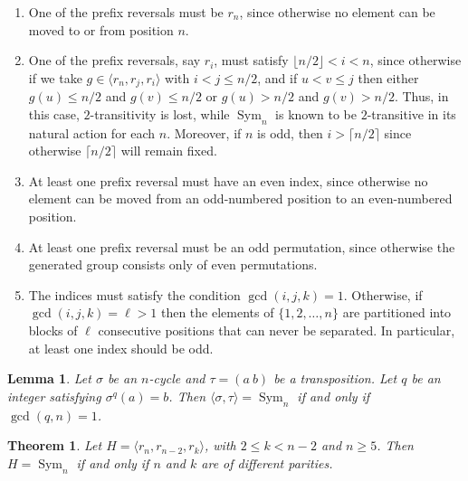 \documentclass[10pt,a4paper]{amsart}
\theoremstyle{plain}
\newtheorem{theorem}{Theorem}
\newtheorem{lemma}{Lemma}
\theoremstyle{definition}
\DeclareMathOperator{\Sym}{\mathrm{Sym}}
\begin{document}
\begin{enumerate}
    \item[$(1)$] One of the prefix reversals must be $r_n$, since otherwise no element can be moved to or from position $n$. 
    \item[$(2)$] One of the prefix reversals, say $r_i$, must satisfy $\lfloor n/2 \rfloor < i < n$, since otherwise if we take $g\in \langle r_n, r_j, r_i\rangle$ with $i<j \leqslant n/2$, and if $u <v \leqslant j$ then either $g(u) \leqslant n/2$ and $g(v) \leqslant n/2$ or $g(u) > n/2$ and $g(v)> n/2$. Thus, in this case, $2$-transitivity is lost, while $\Sym_n$ is known to be $2$-transitive in its natural action for each $n$. Moreover, if $n$ is odd, then $i>\lceil n/2\rceil$ since otherwise $\lceil n/2\rceil$ will remain fixed. 
    \item[$(3)$] At least one prefix reversal must have an even index, since otherwise no element can be moved from an odd-numbered position to an even-numbered position. 
    \item[$(4)$] At least one prefix reversal must be an odd permutation, since otherwise the generated group consists only of even permutations. 
    \item[$(5)$] The indices must satisfy the condition $\gcd(i,j,k)=1$. Otherwise, if $\gcd(i,j,k)=\ell>1$ then the elements of $\{1,2,\ldots,n\}$ are partitioned into blocks of $\ell$ consecutive positions that can never be separated. In particular, at least one index should be odd.
\end{enumerate}

\begin{lemma}\label{lem:janusz} Let $\sigma$ be an $n$-cycle and $\tau=(a \ b)$ be a transposition. Let $q$ be an integer satisfying $\sigma^q(a)=b$. Then $\langle \sigma,\tau\rangle=\Sym_n$ if and only if $\gcd(q,n)=1$.
\end{lemma}

\begin{theorem}\label{thm:n-2}
Let $H=\langle r_n, r_{n-2}, r_k\rangle$, with $2\leqslant k < n-2$ and $n\geqslant 5$. Then $H=\Sym_n$ if and only if $n$ and $k$ are of different parities. 
\end{theorem}
\end{document}
